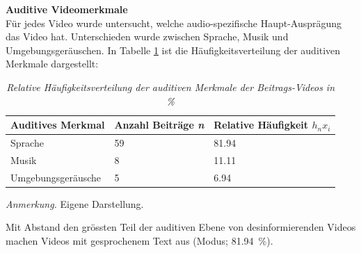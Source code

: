 \documentclass[12pt,a4paper]{article}        %
\begin{document}
\textbf{Auditive Videomerkmale}\\
Für jedes Video wurde untersucht, welche audio-spezifische Haupt-Ausprägung das Video hat. Unterschieden wurde zwischen Sprache, Musik und Umgebungsgeräuschen. In Tabelle \ref{tab:results_auditive_specifications} ist die Häufigkeitsverteilung der auditiven Merkmale dargestellt:
\begin{table}[H]
  \caption{\textit{Relative Häufigkeitsverteilung der auditiven Merkmale der Beitrags-Videos in \%}}
  \label{tab:results_auditive_specifications}
  \centering
  \begin{tabular}{|l|l|l|} \hline
    \textbf{Auditives Merkmal} & \textbf{Anzahl Beiträge \textit{n}}& \textbf{Relative Häufigkeit \({h_n}{x_i}\)} \\ \hline
    Sprache & 59 & 81.94 \\ \hline
    Musik & 8 & 11.11 \\ \hline
    Umgebungsgeräusche & 5 & 6.94 \\ \hline
  \end{tabular}
  \footnotesize\textit{Anmerkung.} Eigene Darstellung.
\end{table}
Mit Abstand den grössten Teil der auditiven Ebene von desinformierenden Videos machen Videos mit gesprochenem Text aus (Modus; 81.94 \%).
\end{document}
